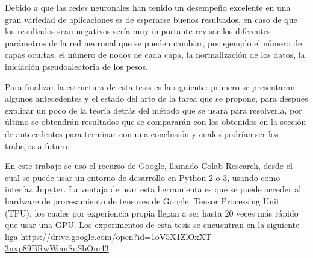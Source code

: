  			\par Debido a que las redes neuronales han tenido un desempeño excelente en una gran variedad de aplicaciones es de esperarse buenos resultados, en caso de que los resultados sean negativos sería muy importante revisar los diferentes parámetros de la red neuronal que se pueden cambiar, por ejemplo el número de capas ocultas, el número de nodos de cada capa, la normalización de los datos, la iniciación pseudoaleatoria de los pesos.
 			
 			\par Para finalizar la estructura de esta tesis es la siguiente: primero se presentaran algunos antecedentes y el estado del arte de la tarea que se propone, para después explicar un poco de la teoría detrás del método que se usará para resolverla, por último se obtendrán resultados que se compararán con los obtenidos en la sección de antecedentes para terminar con una conclusión y cuales podrían ser los trabajos a futuro.
 			
 			\par En este trabajo se usó el recurso de Google, llamado Colab Research, desde el cual se puede usar un entorno de desarrollo en Python 2 o 3, usando como interfaz Jupyter. La ventaja de usar esta herramienta es que se puede acceder al hardware de procesamiento de tensores de Google, Tensor Processing Unit (TPU), los cuales por experiencia propia llegan a ser hasta 20 veces más rápido que usar una GPU. Los experimentos de esta tesis se encuentran en la siguiente liga \href{ https://drive.google.com/open?id=1oV5X1ZlOxXT-3nxp89BRwWcmSuSbOm43}{https://drive.google.com/open?id=1oV5X1ZlOxXT-3nxp89BRwWcmSuSbOm43}